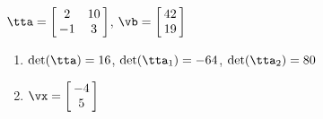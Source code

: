 {$\tta = \left[\hskip -3pt \begin{array}{cc} 2&10\\  -1&3\end {array} \hskip -3pt
 \right]$,
 \quad
$\vb = \left[\hskip -3pt \begin{array}{c} 42\\  19\end {array} \hskip -3pt
 \right]$}
{\begin{enumerate}
\item	$\det(\tta) = 16$, $\det(\tta_1) = -64$, $\det(\tta_2) = 80$
\item $\vx = \left[\hskip -3pt \begin{array}{c} -4\\  5\end{array}\hskip -3pt \right]$
\end{enumerate}
}
  
